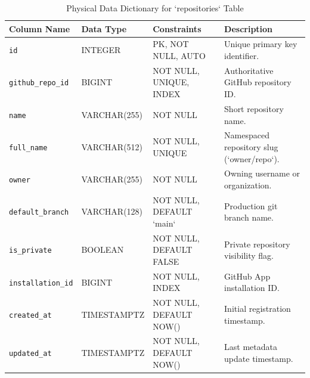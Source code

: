 \documentclass[12pt,a4paper,oneside]{report}
\begin{document}
\begin{table}[htbp]
    \centering
    \caption{Physical Data Dictionary for `repositories` Table}
    \label{tab:app-dict-repos}
    \small
    \begin{tabularx}{\textwidth}{p{} p{} p{} p{}}
        \toprule
        \textbf{Column Name} & \textbf{Data Type} & \textbf{Constraints} & \textbf{Description} \\
        \midrule
        \texttt{id} & INTEGER & PK, NOT NULL, AUTO & Unique primary key identifier. \\
        \texttt{github\_repo\_id} & BIGINT & NOT NULL, UNIQUE, INDEX & Authoritative GitHub repository ID. \\
        \texttt{name} & VARCHAR(255) & NOT NULL & Short repository name. \\
        \texttt{full\_name} & VARCHAR(512) & NOT NULL, UNIQUE & Namespaced repository slug (`owner/repo`). \\
        \texttt{owner} & VARCHAR(255) & NOT NULL & Owning username or organization. \\
        \texttt{default\_branch} & VARCHAR(128) & NOT NULL, DEFAULT `main` & Production git branch name. \\
        \texttt{is\_private} & BOOLEAN & NOT NULL, DEFAULT FALSE & Private repository visibility flag. \\
        \texttt{installation\_id} & BIGINT & NOT NULL, INDEX & GitHub App installation ID. \\
        \texttt{created\_at} & TIMESTAMPTZ & NOT NULL, DEFAULT NOW() & Initial registration timestamp. \\
        \texttt{updated\_at} & TIMESTAMPTZ & NOT NULL, DEFAULT NOW() & Last metadata update timestamp. \\
        \bottomrule
    \end{tabularx}
\end{table}
\end{document}
